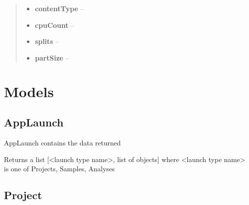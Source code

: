 \documentclass[letterpaper,10pt,english]{sphinxmanual}
\begin{document}
\begin{fulllineitems}
\begin{fulllineitems}
\begin{quote}
\begin{description}
\begin{itemize}
\item {} 
\textbf{contentType} -- 

\item {} 
\textbf{cpuCount} -- 

\item {} 
\textbf{splits} -- 

\item {} 
\textbf{partSize} -- 

\end{itemize}

\end{description}\end{quote}

\end{fulllineitems}


\end{fulllineitems}



\section{Models}
\label{Available modules:models}

\subsection{AppLaunch}
\label{Available modules:applaunch}

\begin{fulllineitems}
\label{Available modules:BaseSpacePy.model.AppLaunch.AppLaunch}
AppLaunch contains the data returned

\begin{fulllineitems}
\label{Available modules:BaseSpacePy.model.AppLaunch.AppLaunch.getLaunchType}
Returns a list {[}\textless{}launch type name\textgreater{}, list of objects{]} where \textless{}launch type name\textgreater{} is one of Projects, Samples, Analyses

\end{fulllineitems}


\end{fulllineitems}



\subsection{Project}
\label{Available modules:project}
\end{document}
